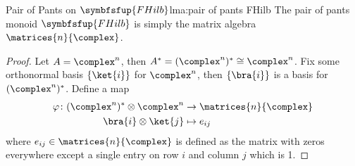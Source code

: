 \documentclass[fleqn]{NotesClass}
\makeatletter
\newcommand{\c@egory}[1]{\symbfsfup{#1}}
\newcommand{\FHilb}{\c@egory{FHilb}}
\newcommand{\isomorphic}{\cong}
\makeatother
\begin{document}
    \begin{lma}{Pair of Pants on {\normalsize\(\FHilb\)}}{lma:pair of pants FHilb}
        The pair of pants monoid \(\FHilb\) is simply the matrix algebra \(\matrices{n}{\complex}\).
        \begin{proof}
            Let \(A = \complex^n\), then \(A^* = (\complex^n)^{*} \isomorphic \complex^n\).
            Fix some orthonormal basis \(\{\ket{i}\}\) for \(\complex^n\), then \(\{\bra{i}\}\) is a basis for \((\complex^n)^*\).
            Define a map
            \begin{align}
                \varphi\colon(\complex^n)^* \otimes \complex^n &\to \matrices{n}{\complex}\\
                \bra{i} \otimes \ket{j} &\mapsto e_{ij}
            \end{align}
            where \(e_{ij} \in \matrices{n}{\complex}\) is defined as the matrix with zeros everywhere except a single entry on row \(i\) and column \(j\) which is 1.
            

\end{proof}
\end{lma}
\end{document}
